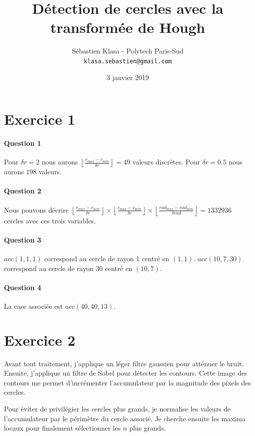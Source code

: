 \documentclass[a4paper,twocolumn]{article}
\title{Détection de cercles avec la transformée de Hough}
\author{
	Sébastien Klasa - Polytech Paris-Sud\\
	\texttt{klasa.sebastien@gmail.com}
}
\date{3 janvier 2019}
\begin{document}
\maketitle

\section{Exercice 1}

\paragraph{Question 1} Pour $\delta r = 2$ nous aurons $\left\lfloor \frac{r_{max} - r_{min}}{\delta r} \right\rfloor = 49$ valeurs discrètes. Pour $\delta r = 0.5$ nous aurons $198$ valeurs.

\paragraph{Question 2} Nous pouvons décrire $\left\lfloor \frac{r_{max} - r_{min}}{\delta r} \right\rfloor \times \left\lfloor \frac{c_{max} - c_{min}}{\delta c} \right\rfloor \times \left\lfloor \frac{rad_{max} - rad_{min}}{\delta rad} \right\rfloor = 1332936$ cercles avec ces trois variables.

\paragraph{Question 3} $acc(1,1,1)$ correspond au cercle de rayon 1 centré en $(1,1)$. $acc(10,7,30)$ correspond au cercle de rayon 30 centré en $(10,7)$.

\paragraph{Question 4} La case associée est $acc(40,40,13)$.

\section{Exercice 2}

Avant tout traitement, j'applique un léger filtre gaussien pour atténuer le bruit. Ensuite, j'applique un filtre de Sobel pour détecter les contours. Cette image des contours me permet d'incrémenter l'accumulateur par la magnitude des pixels des cercles.

Pour éviter de privilégier les cercles plus grands, je normalise les valeurs de l'accumulateur par le périmètre du cercle associé. Je cherche ensuite les maxima locaux pour finalement sélectionner les $n$ plus grands.
\end{document}
